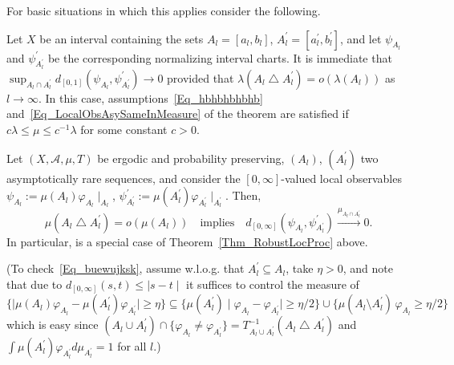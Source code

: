 \documentclass[AHL,Unicode,longabstracts]{cedram}
\newcommand{\clA}{\mathcal{A}}
\begin{document}
For basic situations in which this applies consider the following.

\begin{exam}
Let $X$ be an interval containing the sets $A_{l}=[a_{l},b_{l}]$, $A_{l}^{\prime}=[a_{l}^{\prime},b_{l}^{\prime}]$, and let $\psi_{A_{l}}$ and $\psi_{A_{l}^{\prime}}^{\prime}$ be the corresponding normalizing interval charts. It is immediate that $\sup _{A_{l}\cap A_{l}^{\prime}}d_{[0,1]}(\psi_{A_{l}},\psi_{A_{l}^{\prime} }^{\prime})\rightarrow0$ provided that $\lambda(A_{l}\bigtriangleup A_{l}^{\prime})=o(\lambda(A_{l}))$ as $l\rightarrow\infty$. In this case, assumptions~\eqref{Eq_hbhbhbhbhb} and~\eqref{Eq_LocalObsAsySameInMeasure} of the theorem are satisfied if $c\lambda\leq\mu\leq c^{-1}\lambda$ for some constant $c>0$.
\end{exam}

\begin{exam}\label{Ex_RobustRetTimes}
Let $(X,\clA,\mu,T)$ be ergodic and probability preserving, $(A_{l})$, $(A_{l}^{\prime})$ two asymptotically rare sequences, and consider the $[0,\infty]$-valued local observables $\psi_{A_{l}}:=\mu(A_{l})\varphi_{A_{l}}\mid_{A_{l}}$, $\psi_{A_{l}^{\prime}}^{\prime}:=\mu(A_{l}^{\prime})\varphi_{A_{l}^{\prime} }\mid_{A_{l}^{\prime}}$. Then,
\begin{equation}\label{Eq_buewujksk}
\mu\left(A_{l}\bigtriangleup A_{l}^{\prime}\right)=o\left(\mu(A_{l})\right)\quad\text{implies}\quad d_{[0,\infty]}\left(\psi_{A_{l}},\psi_{A_{l}^{\prime}}^{\prime}\right)\overset{\mu_{A_{l}\cap A_{l}^{\prime}}}{\longrightarrow}0.
\end{equation}
In particular, \cite[Theorem~2.2]{Z11} is a special case of Theorem~\ref{Thm_RobustLocProc} above.

(To check~\eqref{Eq_buewujksk}, assume w.l.o.g. that $A_{l}^{\prime}\subseteq A_{l}$, take $\eta>0$, and note that due to $d_{[0,\infty]}(s,t)\leq\mid s-t\mid$ it suffices to control the measure of $\{\mid\mu(A_{l})\varphi _{A_{l}}-\mu(A_{l}^{\prime})\varphi_{A_{l}^{\prime}}\mid\geq\eta
\}\subseteq\{\mu(A_{l}^{\prime})\mid\varphi_{A_{l}}-\varphi_{A_{l}^{\prime} }\mid\geq\eta/2\}\cup\{\mu(A_{l}\setminus A_{l}^{\prime})\,\varphi_{A_{l}}
\geq\eta/2\}$ which is easy since $(A_{l}\cup A_{l}^{\prime})\cap
\{\varphi_{A_{l}}\neq\varphi_{A_{l}^{\prime}}\}=T_{A_{l}\cup A_{l}^{\prime} }^{-1}(A_{l}\bigtriangleup A_{l}^{\prime})$ and $\int\mu(A_{l}^{\prime })\varphi_{A_{l}^{\prime}}d\mu_{A_{l}^{\prime}}=1$ for all $l$.)
\end{exam}
\end{document}
